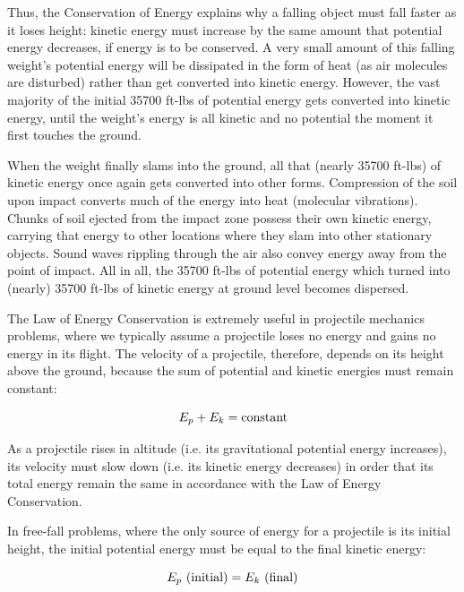 \vskip 10pt

Thus, the Conservation of Energy explains why a falling object must fall faster as it loses height: kinetic energy must increase by the same amount that potential energy decreases, if energy is to be conserved.  A very small amount of this falling weight's potential energy will be dissipated in the form of heat (as air molecules are disturbed) rather than get converted into kinetic energy.  However, the vast majority of the initial 35700 ft-lbs of potential energy gets converted into kinetic energy, until the weight's energy is all kinetic and no potential the moment it first touches the ground.

When the weight finally slams into the ground, all that (nearly 35700 ft-lbs) of kinetic energy once again gets converted into other forms.  Compression of the soil upon impact converts much of the energy into heat (molecular vibrations).  Chunks of soil ejected from the impact zone possess their own kinetic energy, carrying that energy to other locations where they slam into other stationary objects.  Sound waves rippling through the air also convey energy away from the point of impact.  All in all, the 35700 ft-lbs of potential energy which turned into (nearly) 35700 ft-lbs of kinetic energy at ground level becomes dispersed.








\filbreak

The Law of Energy Conservation is extremely useful in projectile mechanics problems, where we typically assume a projectile loses no energy and gains no energy in its flight.  The velocity of a projectile, therefore, depends on its height above the ground, because the sum of potential and kinetic energies must remain constant:   

$$E_p + E_k = \hbox{constant}$$

As a projectile rises in altitude (i.e. its gravitational potential energy increases), its velocity must slow down (i.e. its kinetic energy decreases) in order that its total energy remain the same in accordance with the Law of Energy Conservation.

In free-fall problems, where the only source of energy for a projectile is its initial height, the initial potential energy must be equal to the final kinetic energy:

$$E_p \hbox{ (initial)} = E_k \hbox{ (final)}$$

